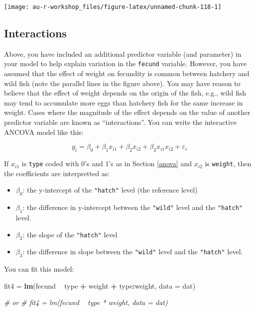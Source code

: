 \documentclass[]{book}
\newenvironment{Shaded}{\begin{snugshade}}{\end{snugshade}}
\newcommand{\KeywordTok}[1]{\textcolor[rgb]{0.13,0.29,0.53}{\textbf{#1}}}
\newcommand{\DataTypeTok}[1]{\textcolor[rgb]{0.13,0.29,0.53}{#1}}
\newcommand{\StringTok}[1]{\textcolor[rgb]{0.31,0.60,0.02}{#1}}
\newcommand{\CommentTok}[1]{\textcolor[rgb]{0.56,0.35,0.01}{\textit{#1}}}
\newcommand{\OperatorTok}[1]{\textcolor[rgb]{0.81,0.36,0.00}{\textbf{#1}}}
\newcommand{\NormalTok}[1]{#1}
\providecommand{\tightlist}{%
  \setlength{\itemsep}{0pt}\setlength{\parskip}{0pt}}
\theoremstyle{definition}
\theoremstyle{definition}
\theoremstyle{definition}
\theoremstyle{remark}
\begin{document}
\begin{center}\texttt{[image: au-r-workshop\_files/figure-latex/unnamed-chunk-118-1]} \end{center}

\subsection{Interactions}\label{interactions}

Above, you have included an additional predictor variable (and
parameter) in your model to help explain variation in the
\texttt{fecund} variable. However, you have assumed that the effect of
weight on fecundity is common between hatchery and wild fish (note the
parallel lines in the figure above). You may have reason to believe that
the effect of weight depends on the origin of the fish, e.g., wild fish
may tend to accumulate more eggs than hatchery fish for the same
increase in weight. Cases where the magnitude of the effect depends on
the value of another predictor variable are known as ``interactions''.
You can write the interactive ANCOVA model like this:

\begin{equation}
  y_i=\beta_0 + \beta_1 x_{i1} + \beta_2 x_{i2} + \beta_3 x_{i1} x_{i2} + \varepsilon_i
\label{eq:ancova-interact}
\end{equation}

If \(x_{i1}\) is \texttt{type} coded with 0's and 1's as in Section
\ref{anova} and \(x_{i2}\) is \texttt{weight}, then the coefficients are
interpretted as:

\begin{itemize}
\tightlist
\item
  \(\beta_0\): the y-intercept of the \texttt{"hatch"} level (the
  reference level)
\item
  \(\beta_1\): the difference in y-intercept between the \texttt{"wild"}
  level and the \texttt{"hatch"} level.
\item
  \(\beta_2\): the slope of the \texttt{"hatch"} level
\item
  \(\beta_3\): the difference in slope between the \texttt{"wild"} level
  and the \texttt{"hatch"} level.
\end{itemize}

You can fit this model:

\begin{Shaded}
\begin{Highlighting}[]
\NormalTok{fit4 =}\StringTok{ }\KeywordTok{lm}\NormalTok{(fecund }\OperatorTok{~}\StringTok{ }\NormalTok{type }\OperatorTok{+}\StringTok{ }\NormalTok{weight }\OperatorTok{+}\StringTok{ }\NormalTok{type}\OperatorTok{:}\NormalTok{weight, }\DataTypeTok{data =}\NormalTok{ dat)}

\CommentTok{# or}
\CommentTok{# fit4 = lm(fecund ~ type * weight, data = dat)}
\end{Highlighting}
\end{Shaded}
\end{document}
